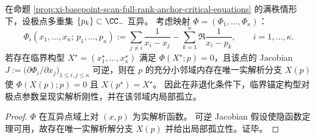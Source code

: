 \begin{proposition}\label{prop:xi-basepoint-scan-critical-configuration-analytic-rigidity}
在命题 \ref{prop:xi-basepoint-scan-full-rank-anchor-critical-equations} 的满秩情形下，设极点多重集 \(\{p_k\}\subset\CC_{-}\) 互异。
考虑映射 \(\Phi=(\Phi_1,\dots,\Phi_\kappa)\)：
\[
\Phi_i(x_1,\dots,x_\kappa;\,p_1,\dots,p_\kappa)
:=\sum_{j\ne i}\frac{1}{x_i-x_j}-\sum_{k=1}^{\kappa}\Re\frac{1}{x_i-p_k},
\qquad i=1,\dots,\kappa.
\]
若存在临界构型 \(X^\star=(x_1^\star,\dots,x_\kappa^\star)\) 满足 \(\Phi(X^\star;p)=0\)，且该点的 Jacobian
\(
J:=\bigl(\partial \Phi_i/\partial x_j\bigr)_{1\le i,j\le \kappa}
\)
可逆，则在 \(p\) 的充分小邻域内存在唯一实解析分支 \(X(p)\) 使 \(\Phi(X(p);p)=0\) 且 \(X(p^\star)=X^\star\)。
因此在非退化条件下，临界锚定构型对极点参数呈现实解析刚性，并在该邻域内局部孤立。
\end{proposition}
\begin{proof}
\(\Phi\) 在互异点域上对 \((x,p)\) 为实解析函数。
可逆 Jacobian 假设使隐函数定理可用，故存在唯一实解析解分支 \(X(p)\) 并给出局部孤立性。证毕。
\end{proof}


\endinput
